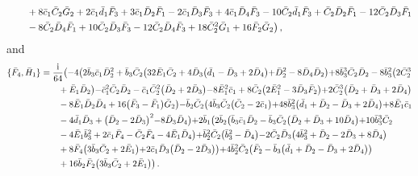 \documentclass[10pt]{amsart}
\theoremstyle{definition}
\theoremstyle{corollary}
\theoremstyle{remark}
\theoremstyle{conclusion}
\begin{document}
\begin{align}
& \hskip 0.7cm+8 \bar{c}_1\bar{C}_2 \bar{G}_2+2 \bar{c}_1 \bar{d}_1 \bar{F}_3+3 \bar{c}_1 \bar{D}_2 \bar{F}_1-2 \bar{c}_1 \bar{D}_3 \bar{F}_3+4 \bar{c}_1 \bar{D}_4 \bar{F}_3-10 \bar{C}_2 \bar{d}_1 \bar{F}_3+\bar{C}_2 \bar{D}_2 \bar{F}_1-12 \bar{C}_2 \bar{D}_3 \bar{F}_1 \nonumber \\
& \hskip 0.7cm-8 \bar{C}_2 \bar{D}_4 \bar{F}_1+10 \bar{C}_2 \bar{D}_3 \bar{F}_3-12 \bar{C}_2 \bar{D}_4 \bar{F}_3+18 \bar{C}_2^2 \bar{G}_1+16 \bar{F}_2 \bar{G}_2\bigl) \,   ,
\end{align} and 
\begin{align} 
\{\bar{F}_4, \bar{H}_1\}&=\frac{{\rm i}}{64}  \bigl(-4 \bigl(2 \bar{b}_3 \bar{c}_1 \bar{D}_2^2+\bar{b}_3 \bar{C}_2 \bigl(32 \bar{E}_1 \bar{C}_2+4 \bar{D}_3 \bigl(\bar{d}_1-\bar{D}_3+2 \bar{D}_4\bigl)+\bar{D}_2^2-8 \bar{D}_4 \bar{D}_2\bigl)+8 \bar{b}_3^3 \bar{C}_2 \bar{D}_2-8 \bar{b}_3^2 \bigl(2 \bar{C}_2^3  \nonumber\\
& \hskip 0.7cm+\bar{E}_1 \bar{D}_2\bigl)-\bar{c}_1^2 \bar{C}_2 \bar{D}_2-\bar{c}_1 \bar{C}_2^2 \bigl(\bar{D}_2+2 \bar{D}_3\bigl)-8 \bar{E}_1^2 \bar{c}_1+8 \bar{C}_2 \bigl(2 \bar{E}_1^2-3 \bar{D}_3 \bar{F}_2\bigl)+2 \bar{C}_2^3 \bigl(\bar{D}_2+\bar{D}_3+2 \bar{D}_4\bigl) \nonumber\\
& \hskip 0.7cm-8 \bar{E}_1 \bar{D}_2 \bar{D}_4+16 \bigl(\bar{F}_3-\bar{F}_1\bigl) \bar{G}_2\bigl)-\bar{b}_2 \bar{C}_2 \bigl(4 \bar{b}_3 \bar{C}_2 \bigl(\bar{C}_2-2 \bar{c}_1\bigl)+48 \bar{b}_3^2 \bigl(\bar{d}_1+\bar{D}_2-\bar{D}_3+2 \bar{D}_4\bigl)+8 \bar{E}_1 \bar{c}_1 \nonumber\\
& \hskip 0.7cm-4 \bar{d}_1 \bar{D}_3+\bigl(\bar{D}_2-2 \bar{D}_3\bigl)^2-8 \bar{D}_3 \bar{D}_4\bigl)+2 \bar{b}_1 \bigl(2 \bar{b}_2 \bigl(\bar{b}_3 \bar{c}_1 \bar{D}_2-\bar{b}_3 \bar{C}_2 \bigl(\bar{D}_2+\bar{D}_3+10 \bar{D}_4\bigl)+10 \bar{b}_3^3 \bar{C}_2 \nonumber\\
& \hskip 0.7cm-4 \bar{E}_1 \bar{b}_3^2+2 \bar{c}_1 \bar{F}_4-\bar{C}_2 \bar{F}_4-4 \bar{E}_1 \bar{D}_4\bigl)+\bar{b}_2^2 \bar{C}_2 \bigl(\bar{b}_3^2-\bar{D}_4\bigl)-2 \bar{C}_2 \bar{D}_3 \bigl(4 \bar{b}_3^2+\bar{D}_2-2 \bar{D}_3+8 \bar{D}_4\bigl) \nonumber\\
& \hskip 0.7cm+8 \bar{F}_4 \bigl(3 \bar{b}_3 \bar{C}_2+2 \bar{E}_1\bigl)+2 \bar{c}_1 \bar{D}_3 \bigl(\bar{D}_2-2 \bar{D}_3\bigl)\bigl)+4 \bar{b}_2^2 \bar{C}_2 \bigl(\bar{F}_2-\bar{b}_3 \bigl(\bar{d}_1+\bar{D}_2-\bar{D}_3+2 \bar{D}_4\bigl)\bigl) \nonumber\\
& \hskip 0.7cm+16 \bar{b}_2 \bar{F}_2 \bigl(3 \bar{b}_3 \bar{C}_2+2 \bar{E}_1\bigl)\bigl) \, .
\end{align} 
\end{document}
